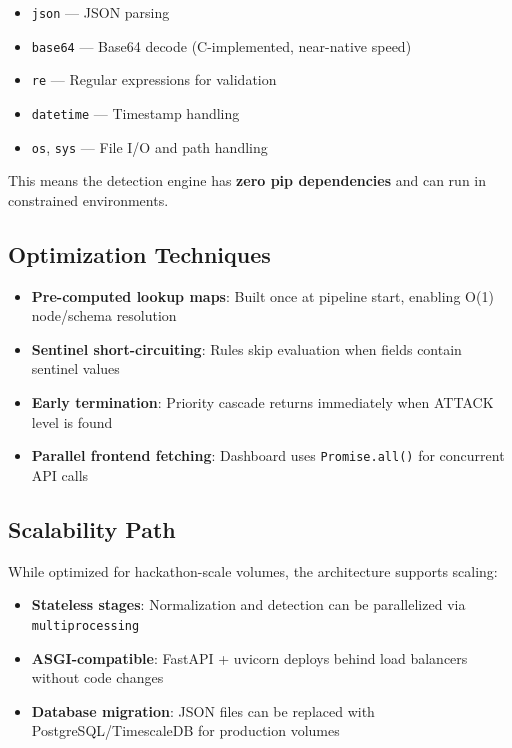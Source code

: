 \documentclass[12pt,a4paper]{article}
\begin{document}
\begin{itemize}[noitemsep]
    \item \texttt{json} --- JSON parsing
    \item \texttt{base64} --- Base64 decode (C-implemented, near-native speed)
    \item \texttt{re} --- Regular expressions for validation
    \item \texttt{datetime} --- Timestamp handling
    \item \texttt{os}, \texttt{sys} --- File I/O and path handling
\end{itemize}

This means the detection engine has \textbf{zero pip dependencies} and can run in constrained environments.

\subsection{Optimization Techniques}

\begin{itemize}[noitemsep]
    \item \textbf{Pre-computed lookup maps}: Built once at pipeline start, enabling O(1) node/schema resolution
    \item \textbf{Sentinel short-circuiting}: Rules skip evaluation when fields contain sentinel values
    \item \textbf{Early termination}: Priority cascade returns immediately when ATTACK level is found
    \item \textbf{Parallel frontend fetching}: Dashboard uses \texttt{Promise.all()} for concurrent API calls
\end{itemize}

\subsection{Scalability Path}

While optimized for hackathon-scale volumes, the architecture supports scaling:

\begin{itemize}[noitemsep]
    \item \textbf{Stateless stages}: Normalization and detection can be parallelized via \texttt{multiprocessing}
    \item \textbf{ASGI-compatible}: FastAPI + uvicorn deploys behind load balancers without code changes
    \item \textbf{Database migration}: JSON files can be replaced with PostgreSQL/TimescaleDB for production volumes
\end{itemize}
\end{document}
